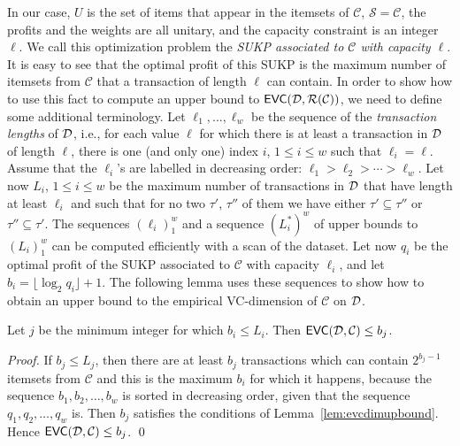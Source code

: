 In our case, $U$ is the set of items that appear in the itemsets of
$\mathcal{C}$, $\mathcal{S}=\mathcal{C}$, the profits and the weights are all
unitary, and the capacity constraint is an integer $\ell$. We call this
optimization problem the \emph{SUKP associated to $\mathcal{C}$ with capacity
$\ell$}.
It is easy to see %
that the optimal profit of this SUKP is the maximum number
of itemsets from $\mathcal{C}$ that a transaction of length $\ell$ can contain.  %
In order to show how to use this fact to compute an upper bound to
$\mathsf{EVC}({\cal D},\mathcal{R}(\mathcal{C}))$, we need to define some additional terminology. Let
$\ell_1,\dotsc,\ell_w$ be the sequence of the
\emph{transaction lengths} of ${\cal D}$, i.e., for each value $\ell$
for which there is at least a transaction in ${\cal D}$ of length $\ell$, there is
one (and only one) index $i$, $1\le i\le w$ such that $\ell_i=\ell$. Assume that
the $\ell_i$'s are labelled in decreasing order:
$\ell_1>\ell_2>\dotsb>\ell_w$. Let now $L_i$, $1\le i\le w$ be the maximum number of
transactions in ${\cal D}$ that have length at least $\ell_i$ and such that
for no two $\tau'$, $\tau''$ of them we have either $\tau'\subseteq\tau''$ or
$\tau''\subseteq\tau'$. The sequences $(\ell_i)_1^w$ and a sequence $(L_i^*)^w$
of upper bounds to $(L_i)_1^w$ can be computed efficiently with a scan of the
dataset. Let now $q_i$ be the optimal profit of the SUKP associated to
$\mathcal{C}$ with capacity $\ell_i$, and let $b_i=\lfloor \log_2q_i\rfloor +1$.
The following lemma uses these sequences to show how to obtain an upper bound to
the empirical VC-dimension of $\mathcal{C}$ on ${\cal D}$.

\begin{lemma}\label{lem:sukpevc}
  Let $j$ be the minimum integer for which $b_i\le L_i$. Then
  $\mathsf{EVC}({\cal D},\mathcal{C})\le b_j$. %
\end{lemma}
\begin{proof}
  If $b_j\le L_j$, then there are at least $b_j$ transactions which can contain
  $2^{b_j-1}$ itemsets from $\mathcal{C}$ and this is the maximum $b_i$ for
  which it happens, because the sequence $b_1,b_2,\dotsc,b_w$ is sorted in
  decreasing order, given that the sequence $q_1,q_2,\dotsc,q_w$ is. Then $b_j$
  satisfies the conditions of Lemma~\ref{lem:evcdimupbound}. Hence
  $\mathsf{EVC}({\cal D},\mathcal{C})\le b_j$.
  \qed
\end{proof}

